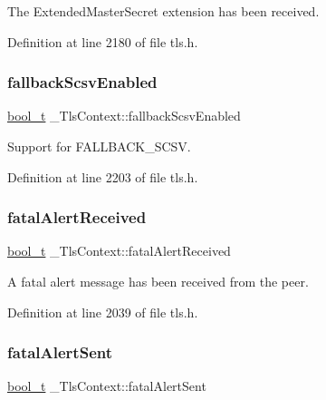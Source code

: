 The Extended\+Master\+Secret extension has been received. 



Definition at line 2180 of file tls.\+h.

\mbox{\label{struct__TlsContext_a35c046259280c78fe437b1c04310b547}} 
\subsubsection{\texorpdfstring{fallback\+Scsv\+Enabled}{fallbackScsvEnabled}}
{\footnotesize\ttfamily \hyperlink{compiler__port_8h_a812d16e5494522586b3784e55d479912}{bool\+\_\+t} \+\_\+\+Tls\+Context\+::fallback\+Scsv\+Enabled}



Support for F\+A\+L\+L\+B\+A\+C\+K\+\_\+\+S\+C\+SV. 



Definition at line 2203 of file tls.\+h.

\mbox{\label{struct__TlsContext_aa5fc7dcae4c69ec2195bb08b1c035475}} 
\subsubsection{\texorpdfstring{fatal\+Alert\+Received}{fatalAlertReceived}}
{\footnotesize\ttfamily \hyperlink{compiler__port_8h_a812d16e5494522586b3784e55d479912}{bool\+\_\+t} \+\_\+\+Tls\+Context\+::fatal\+Alert\+Received}



A fatal alert message has been received from the peer. 



Definition at line 2039 of file tls.\+h.

\mbox{\label{struct__TlsContext_a9cca316cd1de5c20145fc48aa0aa54a7}} 
\subsubsection{\texorpdfstring{fatal\+Alert\+Sent}{fatalAlertSent}}
{\footnotesize\ttfamily \hyperlink{compiler__port_8h_a812d16e5494522586b3784e55d479912}{bool\+\_\+t} \+\_\+\+Tls\+Context\+::fatal\+Alert\+Sent}



